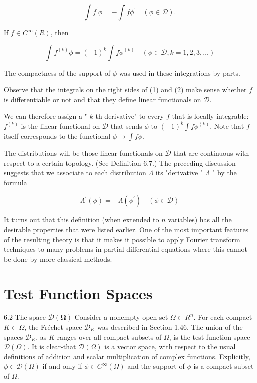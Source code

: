 \documentclass[10pt]{article}
\begin{document}
$$
\int f^{\prime} \phi=-\int f \phi^{\prime} \quad(\phi \in \mathscr{D}) .
$$

If $f \in C^{\infty}(R)$, then

$$
\int f^{(k)} \phi=(-1)^{k} \int f \phi^{(k)} \quad(\phi \in \mathscr{D}, k=1,2,3, \ldots)
$$

The compactness of the support of $\phi$ was used in these integrations by parts.

Observe that the integrals on the right sides of (1) and (2) make sense whether $f$ is differentiable or not and that they define linear functionals on $\mathscr{D}$.

We can therefore assign a " $k$ th derivative" to every $f$ that is locally integrable: $f^{(k)}$ is the linear functional on $\mathscr{D}$ that sends $\phi$ to $(-1)^{k} \int f \phi^{(k)}$. Note that $f$ itself corresponds to the functional $\phi \rightarrow \int f \phi$.

The distributions will be those linear functionals on $\mathscr{D}$ that are continuous with respect to a certain topology. (See Definition 6.7.) The preceding discussion suggests that we associate to each distribution $\Lambda$ its "derivative " $\Lambda$ " by the formula

$$
\Lambda^{\prime}(\phi)=-\Lambda\left(\phi^{\prime}\right) \quad(\phi \in \mathscr{D})
$$

It turns out that this definition (when extended to $n$ variables) has all the desirable properties that were listed earlier. One of the most important features of the resulting theory is that it makes it possible to apply Fourier transform techniques to many problems in partial differential equations where this cannot be done by more classical methods.

\section{Test Function Spaces}
6.2 The space $\mathscr{D}(\boldsymbol{\Omega})$ Consider a nonempty open set $\Omega \subset R^{n}$. For each compact $K \subset \Omega$, the Fréchet space $\mathscr{D}_{K}$ was described in Section 1.46. The union of the spaces $\mathscr{D}_{K}$, as $K$ ranges over all compact subsets of $\Omega$, is the test function space $\mathscr{D}(\Omega)$. It is
clear-that $\mathscr{D}(\Omega)$ is a vector space, with respect to the usual definitions of addition and scalar multiplication of complex functions. Explicitly, $\phi \in \mathscr{D}(\Omega)$ if and only if $\phi \in C^{\infty}(\Omega)$ and the support of $\phi$ is a compact subset of $\Omega$.
\end{document}
